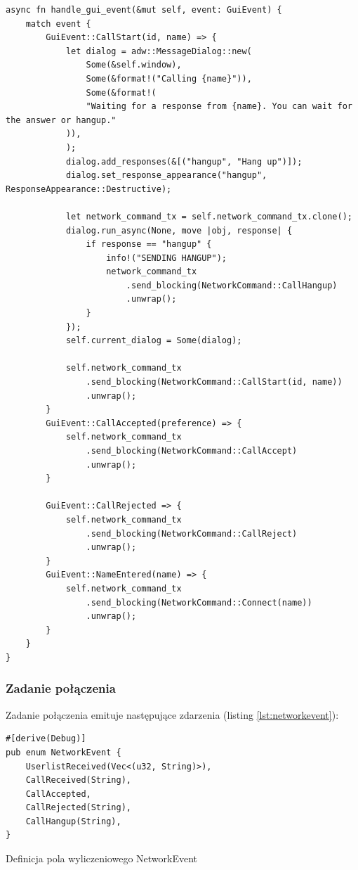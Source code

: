 \begin{verbatim}
async fn handle_gui_event(&mut self, event: GuiEvent) {
    match event {
        GuiEvent::CallStart(id, name) => {
            let dialog = adw::MessageDialog::new(
                Some(&self.window),
                Some(&format!("Calling {name}")),
                Some(&format!(
                "Waiting for a response from {name}. You can wait for the answer or hangup."
            )),
            );
            dialog.add_responses(&[("hangup", "Hang up")]);
            dialog.set_response_appearance("hangup", ResponseAppearance::Destructive);

            let network_command_tx = self.network_command_tx.clone();
            dialog.run_async(None, move |obj, response| {
                if response == "hangup" {
                    info!("SENDING HANGUP");
                    network_command_tx
                        .send_blocking(NetworkCommand::CallHangup)
                        .unwrap();
                }
            });
            self.current_dialog = Some(dialog);

            self.network_command_tx
                .send_blocking(NetworkCommand::CallStart(id, name))
                .unwrap();
        }
        GuiEvent::CallAccepted(preference) => {
            self.network_command_tx
                .send_blocking(NetworkCommand::CallAccept)
                .unwrap();
        }

        GuiEvent::CallRejected => {
            self.network_command_tx
                .send_blocking(NetworkCommand::CallReject)
                .unwrap();
        }
        GuiEvent::NameEntered(name) => {
            self.network_command_tx
                .send_blocking(NetworkCommand::Connect(name))
                .unwrap();
        }
    }
}
\end{verbatim}

\subsubsection{Zadanie połączenia}

Zadanie połączenia emituje następujące zdarzenia (listing \ref{lst:networkevent}):

\begin{listing}[H]
    \begin{verbatim}
#[derive(Debug)]
pub enum NetworkEvent {
    UserlistReceived(Vec<(u32, String)>),
    CallReceived(String),
    CallAccepted,
    CallRejected(String),
    CallHangup(String),
}
\end{verbatim}
    \caption{Definicja pola wyliczeniowego NetworkEvent}
    \label{lst:networkevent}
\end{listing}

